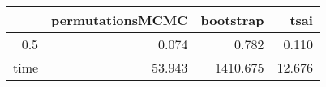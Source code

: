 \begin{table}[ht]
\centering
\begingroup\tiny
\begin{tabular}{rrrr}
  \hline
 & permutationsMCMC & bootstrap & tsai \\ 
  \hline
0.5 & 0.074 & 0.782 & 0.110 \\ 
  time & 53.943 & 1410.675 & 12.676 \\ 
   \hline
\end{tabular}
\endgroup
\end{table}
